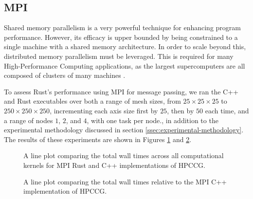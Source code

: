 \subsection{MPI}
\label{ssec:mpi}

Shared memory parallelism is a very powerful technique for enhancing program performance. However, its efficacy is upper bounded by being constrained to a single machine with a shared memory architecture. In order to scale beyond this, distributed memory parallelism must be leveraged. This is required for many High-Performance Computing applications, as the largest supercomputers are all composed of clusters of many machines \cite{HomeTOP500}.

To assess Rust's performance using MPI for message passing, we ran the C++ and Rust executables over both a range of mesh sizes, from $25 \times 25 \times 25$ to $250 \times 250 \times 250$, incrementing each axis size first by $25$, then by $50$ each time, and a range of nodes $1$, $2$, and $4$, with one task per node., in addition to the experimental methodology discussed in section \ref{ssec:experimental-methodology}.
The results of these experiments are shown in Figures \ref{fig:9_mpi_line} and \ref{fig:10_mpi_line_relative}.

\begin{figure}[H]
    \centering
    
    \caption{A line plot comparing the total wall times across all computational kernels for MPI Rust and C++ implementations of HPCCG.}
    \label{fig:9_mpi_line}
\end{figure}

\begin{figure}[H]
    \centering
    
    \caption{A line plot comparing the total wall times relative to the MPI C++ implementation of HPCCG.}
    \label{fig:10_mpi_line_relative}
\end{figure}

